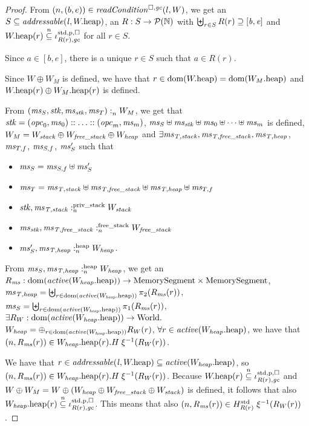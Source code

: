 \documentclass[a4paper]{article}
\begin{document}
\begin{proof}
  From $\npair{(b,e)}\in\readCond{l,W}$, we get an $S \subseteq \addressable{\lin,
    \pwheap}$, an $R : S \rightarrow \powerset{\nats}$ with $\biguplus_{r \in S} R(r) \supseteq [\baddr,\eaddr]$ and $\pwheap(r)
  \nsubeq \stdreg{R(r),\gc}{\pur}$ for all $r \in S$.

  Since $a \in [b,e]$, there is a unique $r \in S$ such that $a \in R(r)$.

  Since $W \oplus W_M$ is defined, we have that $r \in \dom(\pwheap) =
  \dom(\pwheap[W_M])$ and $\pwheap(r) \oplus \pwheap[W_M](r)$ is defined.

  From $\memSat{(\ms_S,\stk,\ms_\stk,\ms_T)}{W_M}$, we get that
  $\stk = (\opc_0,\ms_0):: \dots :: (\opc_m,\ms_m)$,
  $\ms_S \uplus \ms_\stk \uplus \ms_0 \uplus \dots \uplus \ms_m$ is defined,
  $W_M = W_{\var{stack}} \oplus W_{\var{free\_stack}} \oplus W_{\var{heap}}$ and
  $\exists \ms_\var{T,stack}, \ms_\var{T,free\_stack}, \ms_\var{T,heap}$, $\ms_{T,f}$, $\ms_{S,f}$, $\ms_S'$ such that
  \begin{itemize}
  \item $\ms_S =\ms_{S,f} \uplus \ms_S'$
  \item $\ms_T = \ms_\var{T,stack} \uplus \ms_\var{T,free\_stack} \uplus
    \ms_\var{T,heap} \uplus \ms_{T,f}$
  \item $\memSatStack{\stk,\ms_\var{T,stack}}{W_{\var{stack}}}$
  \item $\memSatFStack{\ms_\stk,\ms_\var{T,free\_stack}}{W_{\var{free\_stack}}}$
  \item $\memSatHeap{\ms_S',\ms_\var{T,heap}}{W_\var{heap}}$.
  \end{itemize}

  From $\memSatHeap{\ms_S,\ms_\var{T,heap}}{W_\var{heap}}$, we get an
  $R_\ms : \dom(\activeReg{\pwheap[W_\var{heap}]}) \fun \MemSeg \times \MemSeg$,
  $\ms_\var{T,heap} = \biguplus_{r \in \dom(\activeReg{\pwheap[W_\var{heap}]})} \pi_2(R_\ms(r))$,
  $\ms_S = \biguplus_{r \in \dom(\activeReg{\pwheap[W_\var{heap}]})} \pi_1(R_\ms(r))$,
  $\exists R_W : \dom(\activeReg{\pwheap[W_\var{heap}]}) \fun \World\ldotp$
  $W_\var{heap} = \oplus_{r \in \dom(\activeReg{\pwheap[W_\var{heap}]})} R_W(r)$,
  $\forall r \in \activeReg{\pwheap[W_\var{heap}]}$, we have that
  $\npair{R_\ms(r)} \in  \pwheap[W_\var{heap}](r).H \; \xi^{-1}(R_W(r))$.

  We have that $r \in \addressable{\lin, \pwheap} \subseteq
  \activeReg{\pwheap[W_\var{heap}]}$, so $\npair{R_\ms(r)} \in
  \pwheap[W_\var{heap}](r).H \; \xi^{-1}(R_W(r))$.
  Because $\pwheap(r) \nsubeq \stdreg{R(r),\gc}{\pur}$ and $W\oplus W_M = W \oplus (W_\var{heap} \oplus W_\var{free\_stack} \oplus W_\var{stack})$ is defined, it follows that
  also $\pwheap[W_\var{heap}](r) \nsubeq \stdreg{R(r),\gc}{\pur}$. This
  means that also $\npair{R_\ms(r)} \in
  H^{\mathrm{std}}_{R(r)}\; \xi^{-1}(R_W(r))$.


\end{proof}
\end{document}
